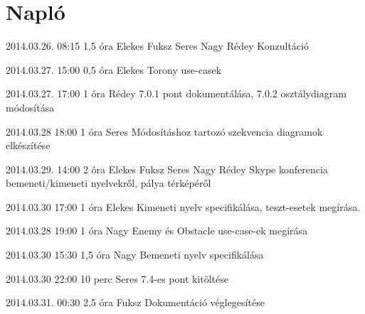 %
\section{Napló}

\begin{naplo}

\bejegyzes
{2014.03.26. 08:15}
{1,5 óra}
{Elekes
Fuksz
Seres
Nagy
Rédey}
{Konzultáció}


\bejegyzes
{2014.03.27. 15:00}
{0,5 óra}
{Elekes}
{Torony  use-casek}

\bejegyzes
{2014.03.27. 17:00}
{1 óra}
{Rédey}
{7.0.1 pont dokumentálása, 7.0.2 osztálydiagram módosítása}

\bejegyzes
{2014.03.28 18:00}
{1 óra}
{Seres}
{Módosításhoz tartozó szekvencia diagramok elkészítése}

\bejegyzes
{2014.03.29. 14:00}
{2 óra}
{Elekes
Fuksz
Seres
Nagy
Rédey}
{Skype konferencia bemeneti/kimeneti nyelvekről, pálya térképéről}

\bejegyzes
{2014.03.30 17:00}
{1 óra}
{Elekes}
{Kimeneti nyelv specifikálása, teszt-esetek megírása.}

\bejegyzes
{2014.03.28 19:00}
{1 óra}
{Nagy}
{Enemy és Obstacle use-case-ek megírása}

\bejegyzes
{2014.03.30 15:30}
{1,5 óra}
{Nagy}
{Bemeneti nyelv specifikálása}

\bejegyzes
{2014.03.30 22:00}
{10 perc}
{Seres}
{7.4-es pont kitöltése}

\bejegyzes
{2014.03.31. 00:30}
{2,5 óra}
{Fuksz}
{Dokumentáció véglegesítése}


\end{naplo}

